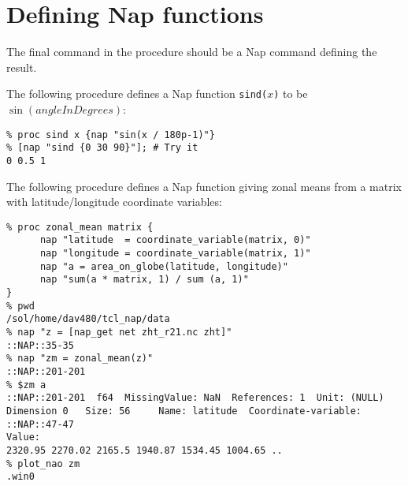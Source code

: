 
\section{Defining Nap functions}

  The final command in the procedure should be a Nap command
  defining the result.
  

The following procedure defines a Nap function 
\texttt{sind(}$x$\texttt{)} 
to be 
$\sin (\mathit{angleInDegrees})$:
  \begin{verbatim}
% proc sind x {nap "sin(x / 180p-1)"}
% [nap "sind {0 30 90}"]; # Try it
0 0.5 1
\end{verbatim}

  

The following procedure defines a Nap function giving zonal means
  from a matrix with latitude/longitude coordinate variables:
  \begin{verbatim}
% proc zonal_mean matrix {
      nap "latitude  = coordinate_variable(matrix, 0)"
      nap "longitude = coordinate_variable(matrix, 1)"
      nap "a = area_on_globe(latitude, longitude)"
      nap "sum(a * matrix, 1) / sum (a, 1)"
}
% pwd
/sol/home/dav480/tcl_nap/data
% nap "z = [nap_get net zht_r21.nc zht]"
::NAP::35-35
% nap "zm = zonal_mean(z)"
::NAP::201-201
% $zm a
::NAP::201-201  f64  MissingValue: NaN  References: 1  Unit: (NULL)
Dimension 0   Size: 56     Name: latitude  Coordinate-variable: ::NAP::47-47
Value:
2320.95 2270.02 2165.5 1940.87 1534.45 1004.65 ..
% plot_nao zm
.win0
\end{verbatim}


